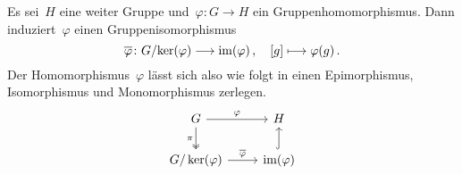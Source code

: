 \begin{corollary}
  Es sei~$H$ eine weiter Gruppe und~$\varphi \colon G \to H$ ein Gruppenhomomorphismus.
  Dann induziert~$\varphi$ einen Gruppenisomorphismus
  \[
    \induced{\varphi}
    \colon
    G/{\ker(\varphi)} \to \im(\varphi) \,,
    \quad
    \class{g}
    \mapsto
    \varphi(g) \,.
  \]
  Der Homomorphismus~$\varphi$ lässt sich also wie folgt in einen Epimorphismus, Isomorphismus und Monomorphismus zerlegen.
  \[
    \begin{tikzcd}
      G
      \arrow{r}[above]{\varphi}
      \arrow[two heads]{d}[left]{\pi}
      &
      H
      \\
      G/\ker(\varphi)
      \arrow{r}[above]{\induced{\varphi}}
      &
      \im(\varphi)
      \arrow[hook]{u}
    \end{tikzcd}
  \]
\end{corollary}

